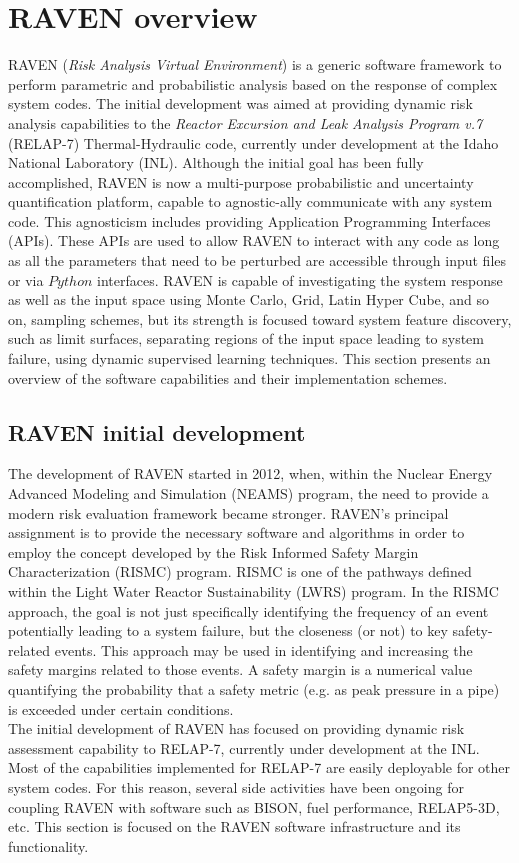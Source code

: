 \section{RAVEN overview}
RAVEN (\textit{Risk Analysis Virtual Environment}) is a generic software framework to perform parametric and probabilistic analysis based on the response of complex system codes. The initial development was aimed at providing dynamic risk analysis capabilities to the \textit{Reactor Excursion and Leak Analysis Program v.7} (RELAP-7) Thermal-Hydraulic code, currently under development at the Idaho National Laboratory (INL). Although the initial goal has been fully accomplished, RAVEN is now a multi-purpose probabilistic and uncertainty quantification platform, capable to agnostic-ally communicate with any system code. This agnosticism includes providing Application Programming Interfaces (APIs). These APIs are used to allow RAVEN to interact with any code as long as all the parameters that need to be perturbed are accessible through input files or via  $Python$ interfaces. RAVEN is capable of investigating the system response as well as the input space using Monte Carlo, Grid, Latin Hyper Cube, and so on, sampling schemes, but its strength is focused toward system feature discovery, such as limit surfaces, separating regions of the input space leading to system failure, using dynamic supervised learning techniques. This section presents an overview of the software capabilities and their implementation schemes. 

\subsection{RAVEN initial development}
The development of RAVEN started in 2012, when, within the Nuclear Energy Advanced Modeling and Simulation (NEAMS) program, the need to provide a modern risk evaluation framework became stronger. RAVEN’s principal assignment is to provide the necessary software and algorithms in order to employ the concept developed by the Risk Informed Safety Margin Characterization (RISMC) program. RISMC is one of the pathways defined within the Light Water Reactor Sustainability (LWRS) program. In the RISMC approach, the goal is not just specifically identifying the frequency of an event potentially leading to a system failure, but the closeness (or not) to key safety-related events. This approach may be used in identifying and increasing the safety margins related to those events. A safety margin is a numerical value quantifying the probability that a safety metric (e.g. as peak pressure in a pipe) is exceeded under certain conditions.
\\The initial development of RAVEN has focused on providing dynamic risk assessment capability to RELAP-7, currently under development at the INL.
Most of the capabilities implemented for RELAP-7 are easily deployable for other system codes. For this reason, several side activities have been ongoing for coupling RAVEN with software such as BISON, fuel performance, RELAP5-3D, etc. This section is focused on the RAVEN software infrastructure and its functionality.


